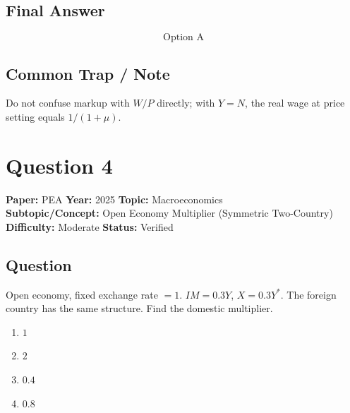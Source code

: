 \documentclass[11pt]{article}
\begin{document}
\subsection*{Final Answer}
\[
\boxed{\text{Option A}}
\]

\subsection*{Common Trap / Note}
Do not confuse markup with $W/P$ directly; with $Y=N$, the real wage at price setting equals $1/(1+\mu)$.

\section*{Question 4}
\textbf{Paper:} PEA \quad \textbf{Year:} 2025 \quad \textbf{Topic:} Macroeconomics \\
\textbf{Subtopic/Concept:} Open Economy Multiplier (Symmetric Two-Country) \\
\textbf{Difficulty:} Moderate \quad \textbf{Status:} Verified

\subsection*{Question}
Open economy, fixed exchange rate $=1$. $IM = 0.3Y$, $X = 0.3Y^*$. The foreign country has the same structure. Find the domestic multiplier.

\begin{enumerate}[label=(\Alph*)]
\item $1$ \quad \item $2$ \quad \item $0.4$ \quad \item $0.8$
\end{enumerate}
\end{document}
